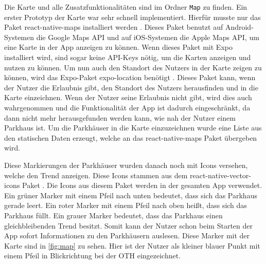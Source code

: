 Die Karte und alle Zusatzfunktionalitäten sind im Ordner \verb|Map| zu finden. Ein erster Prototyp der Karte war sehr schnell implementiert. Hierfür musste nur das Paket react-native-maps installiert werden \cite{maps}. Dieses Paket benutzt auf Android-Systemen die Google Maps API und auf iOS-Systemen die Apple Maps API, um eine Karte in der App anzeigen zu können. Wenn dieses Paket mit Expo installiert wird, sind sogar keine API-Keys nötig, um die Karten anzeigen und nutzen zu können. Um nun auch den Standort des Nutzers in der Karte zeigen zu können, wird das Expo-Paket expo-location benötigt \cite{location}. Dieses Paket kann, wenn der Nutzer die Erlaubnis gibt, den Standort des Nutzers herausfinden und in die Karte einzeichnen. Wenn der Nutzer seine Erlaubnis nicht gibt, wird dies auch wahrgenommen und die Funktionalität der App ist dadurch eingeschränkt, da dann nicht mehr herausgefunden werden kann, wie nah der Nutzer einem Parkhaus ist. Um die Parkhäuser in die Karte einzuzeichnen wurde eine Liste aus den statischen Daten erzeugt, welche an das react-native-maps Paket übergeben wird.

Diese Markierungen der Parkhäuser wurden danach noch mit Icons versehen, welche den Trend anzeigen. Diese Icons stammen aus dem react-native-vector-icons Paket \cite{vector-icons}. Die Icons aus diesem Paket werden in der gesamten App verwendet. Ein grüner Marker mit einem Pfeil nach unten bedeutet, dass sich das Parkhaus gerade leert. Ein roter Marker mit einem Pfeil nach oben heißt, dass sich das Parkhaus füllt. Ein grauer Marker bedeutet, dass das Parkhaus einen gleichbleibenden Trend besitzt. Somit kann der Nutzer schon beim Starten der App sofort Informationen zu den Parkhäusern auslesen. Diese Marker mit der Karte sind in \autoref{fig:map} zu sehen. Hier ist der Nutzer als kleiner blauer Punkt mit einem Pfeil in Blickrichtung bei der OTH eingezeichnet.

